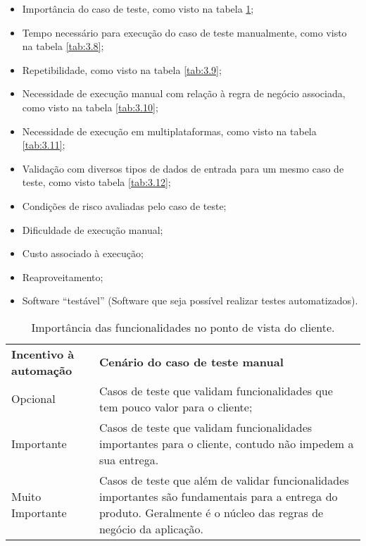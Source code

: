 \begin{itemize}
    \item Importância do caso de teste, como visto na tabela \ref{tab:3.7};
    \item Tempo necessário para execução do caso de teste manualmente, como visto na tabela \ref{tab:3.8};
    \item Repetibilidade, como visto na tabela \ref{tab:3.9};
    \item Necessidade  de execução manual com relação à regra de negócio associada, como visto na tabela \ref{tab:3.10};
    \item Necessidade de execução em multiplataformas, como visto na tabela \ref{tab:3.11};
    \item Validação com diversos tipos de dados de entrada para um mesmo caso de teste, como visto tabela \ref{tab:3.12};
    \item Condições de risco avaliadas pelo caso de teste;
    \item Dificuldade de execução manual;
    \item Custo associado à execução;
    \item Reaproveitamento;

    \item Software “testável” (Software que seja possível realizar testes automatizados).
\end{itemize}

\begin{table}[H]
\centering
\caption{Importância das funcionalidades no ponto de vista do cliente.}
\label{tab:3.7}
\begin{tabular} {|p{50mm}|p{80mm}|}
\cline{1-2}
\textbf{Incentivo à automação} & \textbf{Cenário do caso de teste manual} \\                      \cline{1-2}
    Opcional & Casos de teste que validam funcionalidades que tem pouco valor para o cliente;\\
    \cline{1-2}
    Importante & Casos de teste que validam funcionalidades importantes para o cliente, contudo não impedem a sua entrega.\\                                                    \cline{1-2}
    Muito Importante & Casos de teste que além de validar funcionalidades importantes são fundamentais para a entrega do produto. Geralmente é o núcleo das regras de negócio da aplicação.\\ 
    \cline{1-2}
\end{tabular}
\end{table}

